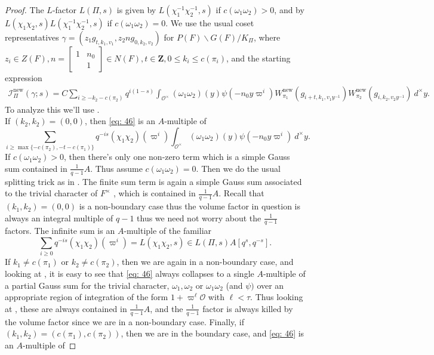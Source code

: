 \documentclass{amsart}
\theoremstyle{plain}
\theoremstyle{plain}
\theoremstyle{remark}
\begin{document}
\begin{proof}
    The $L$-factor $L(\Pi,s)$ is given by $L(\chi_1^{-1}\chi_2^{-1},s)$ if $c(\omega_1\omega_2)>0$, and by $L(\chi_1\chi_2,s)L(\chi_1^{-1}\chi_2^{-1},s)$ if $c(\omega_1\omega_2)=0$. We use the usual coset representatives $\gamma=(z_1g_{t,k_1,v_1},z_2ng_{0,k_2,v_2})$ for $P(F)\backslash G(F)/K_\Pi$, where $z_i\in Z(F),n=\left[\begin{smallmatrix}
            1 & n_0\\
            & 1
        \end{smallmatrix}\right]\in N(F),t\in\mathbf{Z}, 0\leq k_i\leq c(\pi_i)$, and the starting expression
    \begin{align}\label{eq: 46}
        {\mathcal{I}_{\Pi}^\mathrm{new}(\gamma;s)=C\sum_{i\geq -k_2-c(\pi_2)}q^{i(1-s)}\int_{\mathcal{O}^\times}(\omega_1\omega_2)(y)\psi(-n_0y\varpi^i)W_{\pi_1}^\mathrm{new}(g_{i+t,k_1,v_1y^{-1}})W_{\pi_2}^\mathrm{new}(g_{i,k_2,v_2y^{-1}})\ d^\times y}.
    \end{align}
        To analyze this we'll use .\\
    If $(k_2,k_2)=(0,0)$, then \eqref{eq: 46} is an $A$-multiple of 
    $$\sum_{i\geq \max\{-c(\pi_2),-t-c(\pi_1)\}}q^{-is}(\chi_1\chi_2)(\varpi^i)\int_{\mathcal{O}^\times}(\omega_1\omega_2)(y)\psi(-n_0y\varpi^i)\ d^\times y.$$
    If $c(\omega_1\omega_2)>0$, then there's only one non-zero term which is a simple Gauss sum contained in $\tfrac{1}{q-1}A$. Thus assume $c(\omega_1\omega_2)=0$. Then we do the usual splitting trick as in . The finite sum term is again a simple Gauss sum associated to the trivial character of $F^\times$ , which is contained in $\tfrac{1}{q-1}A$. Recall that $(k_1,k_2)=(0,0)$ is a non-boundary case thus the volume factor in question is always an integral multiple of $q-1$ thus we need not worry about the $\tfrac{1}{q-1}$ factors. The infinite sum is an  $A$-multiple of the familiar 
    $$\sum_{i\geq 0}q^{-is}(\chi_1\chi_2)(\varpi^i)=L(\chi_1\chi_2,s)\in L(\Pi,s)A[q^s,q^{-s}].$$
    If $k_1\neq c(\pi_1)$ or $k_2\neq c(\pi_2)$, then we are again in a non-boundary case, and looking at , it is easy to see that \eqref{eq: 46} always collapses to a single $A$-multiple of a partial Gauss sum for the trivial character, $\omega_1,\omega_2$ or $\omega_1\omega_2$ (and $\psi)$ over an appropriate region of integration of the form $1+\varpi^\ell\mathcal{O}$ with $\ell<\tau$. Thus looking at , these are always contained in $\tfrac{1}{q-1}A$, and the $\tfrac{1}{q-1}$ factor is always killed by the volume factor since we are in a non-boundary case. Finally, if $(k_1,k_2)=(c(\pi_1),c(\pi_2))$, then we are in the boundary case, and \eqref{eq: 46} is an $A$-multiple of 

\end{proof}
\end{document}
